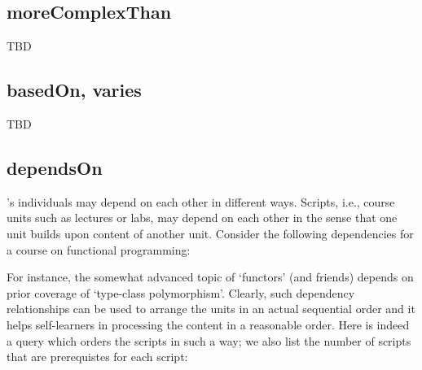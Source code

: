 
\subsection{moreComplexThan}
\label{S:moreComplexThan}

TBD

\begin{comment}
Aha, moreComplexThan!?
- A contribution being more complex than another contribution
- A feature being more complex than another feature
- Does this sound like something applicable to language subset relationship?
\end{comment}


\subsection{basedOn, varies}
\label{S:basedOn}
\label{S:varies}

TBD

\begin{comment}
Contributions based on other contributions
Contributions varying other contributions
\end{comment}


\subsection{dependsOn}
\label{S:dependsOn}

\solasote{}'s individuals may depend on each other in different
ways. Scripts, i.e., course units such as lectures or labs, may depend
on each other in the sense that one unit builds upon content of
another unit. Consider the following dependencies for a course on
functional programming:



\noindent
For instance, the somewhat advanced topic of `functors' (and friends)
depends on prior coverage of `type-class polymorphism'. Clearly, such
dependency relationships can be used to arrange the units in an actual
sequential order and it helps self-learners in processing the content
in a reasonable order. Here is indeed a query which orders the scripts
in such a way; we also list the number of scripts that are
prerequistes for each script:

